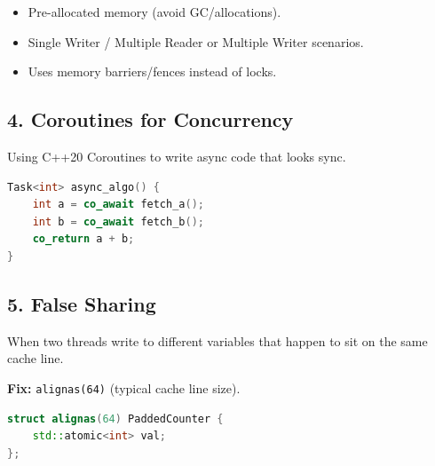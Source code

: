 \begin{itemize}
\tightlist
\item
  Pre-allocated memory (avoid GC/allocations).
\item
  Single Writer / Multiple Reader or Multiple Writer scenarios.
\item
  Uses memory barriers/fences instead of locks.
\end{itemize}

\hypertarget{coroutines-for-concurrency}{%
\subsection{4. Coroutines for
Concurrency}\label{coroutines-for-concurrency}}

Using C++20 Coroutines to write async code that looks sync.

\begin{lstlisting}[language={C++}]
Task<int> async_algo() {
    int a = co_await fetch_a();
    int b = co_await fetch_b();
    co_return a + b;
}
\end{lstlisting}

\hypertarget{false-sharing}{%
\subsection{5. False Sharing}\label{false-sharing}}

When two threads write to different variables that happen to sit on the
same cache line.

\textbf{Fix:} \passthrough{\lstinline!alignas(64)!} (typical cache line
size).

\begin{lstlisting}[language={C++}]
struct alignas(64) PaddedCounter {
    std::atomic<int> val;
};
\end{lstlisting}
